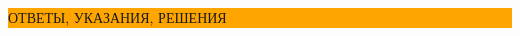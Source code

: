 \newpage
\centering \colorbox{orange}{\parbox{0.7}{ \centering                                                          }}\\
\centering \colorbox{orange}{\parbox{0.7}{ \centering                                                          }}\\
\centering \colorbox{orange}{\parbox{0.7\textwidth}{ \centering ОТВЕТЫ, УКАЗАНИЯ, РЕШЕНИЯ}}
\begin{multicols}{2}

\end{multicols}


